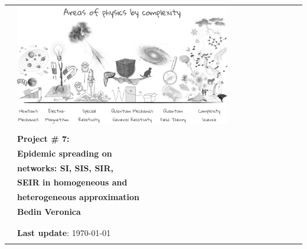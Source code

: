\begin{center}
\begin{spacing}{1.3}
\begin{tabular}{p{4cm} ll}
&  \includegraphics[width=0.77\textwidth]{images/areas_of_physics.png} \\\\
& \textcolor{unipd}{\textbf{\huge Project \# 7:}} \\
& \textcolor{unipd}{\textbf{\huge Epidemic spreading on } }\\ 
& \textcolor{unipd}{\textbf{\huge networks: SI, SIS, SIR, } }\\
& \textcolor{unipd}{\textbf{\huge SEIR in homogeneous and}   }  \\
& \textcolor{unipd}{\textbf{\huge heterogeneous approximation}} \\
& \textbf{Bedin Veronica}\\
& \\
& \\
& \scriptsize \textbf{Last update}: \today\\\\
\end{tabular}

\end{spacing}

\end{center}




\thispagestyle{empty} %
\clearpage\setcounter{page}{1} %
